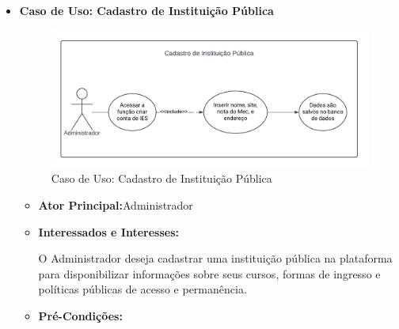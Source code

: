 \begin{itemize}
    \item \textbf{Caso de Uso: Cadastro de Instituição Pública}

    \begin{figure}[ht]
        \centering
        \includegraphics[scale=0.8]{caso-de-uso_cadastro-de-usuario-instituição.png}
        \caption{Caso de Uso: Cadastro de Instituição Pública}
        \label{fig:enter-label}
    \end{figure}

    \begin{itemize}
        \item \textbf{Ator Principal:}Administrador
        \item \textbf{Interessados e Interesses:}

        O Administrador deseja cadastrar uma instituição pública na plataforma para disponibilizar informações sobre seus cursos, formas de ingresso e políticas públicas de acesso e permanência.

        \item \textbf{Pré-Condições:}


\end{itemize}
\end{itemize}
